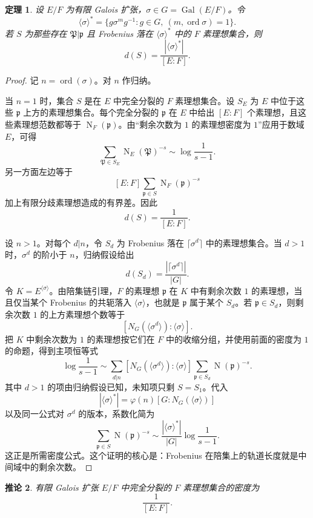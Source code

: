 \documentclass[11pt,a4paper,openany]{ctexbook}
\numberwithin{equation}{chapter}
\newcommand{\Gal}{\operatorname{Gal}}
\newcommand{\Nm}{\operatorname{N}}
\theoremstyle{plain}
\newtheorem{theorem}{定理}[chapter]
\newtheorem{corollary}[theorem]{推论}
\theoremstyle{definition}
\theoremstyle{remark}
\begin{document}
\begin{theorem}
设 $E/F$ 为有限 Galois 扩张，$\sigma\in G=\Gal(E/F)$。令
\[
\langle\sigma\rangle^\ast
=\{g\sigma^mg^{-1}:g\in G,\ (m,\operatorname{ord}\sigma)=1\}.
\]
若 $S$ 为那些存在 $\mathfrak P|\mathfrak p$ 且 Frobenius 落在 $\langle\sigma\rangle^\ast$ 中的 $F$ 素理想集合，则
\[
d(S)=\frac{|\langle\sigma\rangle^\ast|}{[E:F]}.
\]
\end{theorem}

\begin{proof}
记 $n=\operatorname{ord}(\sigma)$。对 $n$ 作归纳。

当 $n=1$ 时，集合 $S$ 是在 $E$ 中完全分裂的 $F$ 素理想集合。设
$S_E$ 为 $E$ 中位于这些 $\mathfrak p$ 上方的素理想集合。每个完全分裂的
$\mathfrak p$ 在 $E$ 中给出 $[E:F]$ 个素理想，且这些素理想范数都等于
$\Nm_F(\mathfrak p)$。由“剩余次数为 $1$ 的素理想密度为 $1$”应用于数域 $E$，可得
\[
\sum_{\mathfrak P\in S_E}\Nm_E(\mathfrak P)^{-s}
\sim \log\frac1{s-1}.
\]
另一方面左边等于
\[
[E:F]\sum_{\mathfrak p\in S}\Nm_F(\mathfrak p)^{-s}
\]
加上有限分歧素理想造成的有界差。因此
\[
d(S)=\frac1{[E:F]}.
\]

设 $n>1$。对每个 $d|n$，令 $S_d$ 为 Frobenius 落在
\(\lceil\sigma^d\rceil\) 中的素理想集合。当 $d>1$ 时，$\sigma^d$ 的阶小于
$n$，归纳假设给出
\[
d(S_d)=\frac{|\lceil\sigma^d\rceil|}{|G|}.
\]
令 $K=E^{\langle\sigma\rangle}$。由陪集链引理，$F$ 的素理想 $\mathfrak p$ 在
$K$ 中有剩余次数 $1$ 的素理想，当且仅当某个 Frobenius 的共轭落入
\(\langle\sigma\rangle\)，也就是 $\mathfrak p$ 属于某个 $S_d$。若
$\mathfrak p\in S_d$，则剩余次数 $1$ 的上方素理想个数等于
\[
[N_G(\langle\sigma^d\rangle):\langle\sigma\rangle].
\]
把 $K$ 中剩余次数为 $1$ 的素理想按它们在 $F$ 中的收缩分组，并使用前面的密度为
$1$ 的命题，得到主项恒等式
\[
\log\frac1{s-1}
\sim
\sum_{d|n}
[N_G(\langle\sigma^d\rangle):\langle\sigma\rangle]
\sum_{\mathfrak p\in S_d}\Nm(\mathfrak p)^{-s}.
\]
其中 $d>1$ 的项由归纳假设已知，未知项只剩 $S=S_1$。代入
\[
|\langle\sigma\rangle^\ast|
=\varphi(n)[G:N_G(\langle\sigma\rangle)]
\]
以及同一公式对 $\sigma^d$ 的版本，系数化简为
\[
\sum_{\mathfrak p\in S}\Nm(\mathfrak p)^{-s}
\sim
\frac{|\langle\sigma\rangle^\ast|}{|G|}
\log\frac1{s-1}.
\]
这正是所需密度公式。这个证明的核心是：Frobenius 在陪集上的轨道长度就是中间域中的剩余次数。
\end{proof}

\begin{corollary}
有限 Galois 扩张 $E/F$ 中完全分裂的 $F$ 素理想集合的密度为
\[
\frac1{[E:F]}.
\]
\end{corollary}
\end{document}
